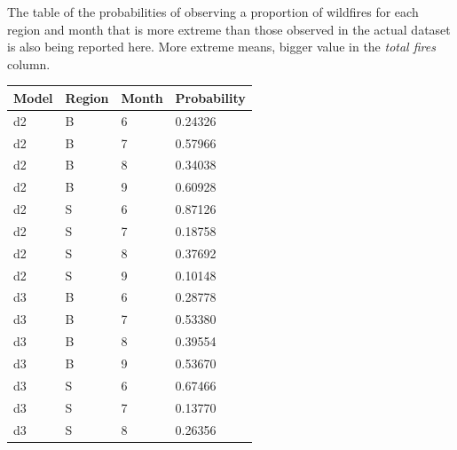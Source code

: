 \documentclass[12pt,a4paper]{article}
\begin{document}
\begin{enumerate}[(a)]
The table of the probabilities of observing a proportion of wildfires for each region and month that is more extreme than those observed in the actual dataset is also being reported here. More extreme means, bigger value in the \textit{total fires} column.

\begin{table}
\centering
\begin{tabular}{|l|lll|} 
\hline
\multicolumn{1}{|l}{Model} & Region & Month & Probability                                        \\ 
\hline
d2                         & B      & 6     & 0.24326                                            \\
d2                         & B      & 7     & 0.57966                                            \\
d2                         & B      & 8     & 0.34038                                            \\
d2                         & B      & 9     & 0.60928                                            \\
d2                         & S      & 6     & 0.87126                                            \\
d2                         & S      & 7     & 0.18758                                            \\
d2                         & S      & 8     & 0.37692                                            \\
d2                         & S      & 9     & 0.10148                                            \\
d3                         & B      & 6     & 0.28778                                            \\
d3                         & B      & 7     & 0.53380                                            \\
d3                         & B      & 8     & 0.39554                                            \\
d3                         & B      & 9     & 0.53670                                            \\
d3                         & S      & 6     & 0.67466                                            \\
d3                         & S      & 7     & 0.13770                                            \\
d3                         & S      & 8     & 0.26356                                            \\

\end{tabular}
\end{table}
\end{enumerate}
\end{document}
